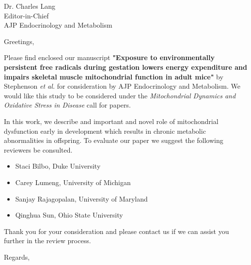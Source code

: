 \documentclass[a4paper,12pt]{letter}
\begin{document}
\begin{letter}{Dr. Charles Lang\\Editor-in-Chief\\AJP Endocrinology and Metabolism}

\opening{Greetings,} %

Please find enclosed our manuscript \textbf{"Exposure to environmentally persistent free radicals during gestation lowers energy expenditure and impairs skeletal muscle mitochondrial function in adult mice"} by Stephenson \textit{et al.} for consideration by AJP Endocrinology and Metabolism.  We would like this study to be considered under the \emph{Mitochondrial Dynamics and Oxidative Stress in Disease} call for papers.

In this work, we describe and important and novel role of mitochondrial dysfunction early in development which results in chronic metabolic abnormalities in offspring.  To evaluate our paper we suggest the following reviewers be consulted.

\begin{itemize}
\item Staci Bilbo, Duke University %
\item Carey Lumeng, University of Michigan %
\item Sanjay Rajagopalan, University of Maryland %
\item Qinghua Sun, Ohio State University %
\end{itemize}

Thank you for your consideration and please contact us if we can assist you further in the review process.

\closing{Regards,} %


\end{letter}
\end{document}
